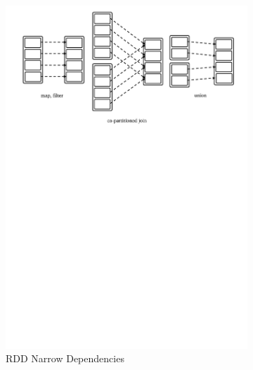 \begin{figure}[!htbp]
    \centering
    \begin{subfigure}[b]{\linewidth}
        \centering
        \includegraphics[clip,trim=1.5cm 19.5cm 1.1cm 0.5cm,scale=0.9]{narrow-dep.pdf}
        \caption[RDD Narrow Dependencies]{RDD Narrow Dependencies\footnotemark}
        \label{fig:sp:narrow-dep}
    \end{subfigure}
    \begin{subfigure}[b]{\linewidth}
        \centering

\end{subfigure}
\end{figure}
